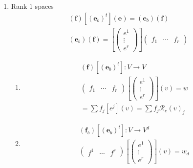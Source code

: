 \documentclass[aps,preprint]{revtex4}
\begin{document}
\begin{enumerate}
\item Rank $1$ spaces \label{Rank 1 spaces}%
\begin{gather}
\left( \boldsymbol{f}\right) \left[ \left( \mathbf{e}_{b}\right) ^{t}\right]
\left( \mathbf{e}\right) =\left( \mathbf{e}_{b}\right) \left( \boldsymbol{f}%
\right) \\
\left( \mathbf{e}_{b}\right) \left( \boldsymbol{f}\right) =\left[ \left( 
\begin{array}{c}
e^{1} \\ 
\vdots \\ 
e^{r}%
\end{array}%
\right) \right] \left( 
\begin{array}{ccc}
f_{1} & \cdots & f_{r}%
\end{array}%
\right)
\end{gather}

\begin{enumerate}
\item 
\begin{gather}
\left( \boldsymbol{f}\right) \left[ \left( \mathbf{e}_{b}\right) ^{t}\right]
:V\rightarrow V \\
\left( 
\begin{array}{ccc}
f_{1} & \cdots & f_{r}%
\end{array}%
\right) \left[ \left( 
\begin{array}{c}
e^{1} \\ 
\vdots \\ 
e^{r}%
\end{array}%
\right) \right] \left( v\right) =w \\
=\sum f_{j}\left[ e^{j}\right] \left( v\right) =\sum f_{j}\mathcal{R}%
_{e}\left( v\right) _{j}
\end{gather}

\item 
\begin{gather}
\left( \boldsymbol{f}_{b}\right) \left[ \left( \mathbf{e}_{b}\right) ^{t}%
\right] :V\rightarrow V^{d} \\
\left( 
\begin{array}{ccc}
f^{1} & \cdots & f^{r}%
\end{array}%
\right) \left[ \left( 
\begin{array}{c}
e^{1} \\ 
\vdots \\ 
e^{r}%
\end{array}%
\right) \right] \left( v\right) =w_{d}
\end{gather}


\end{enumerate}
\end{enumerate}
\end{document}
